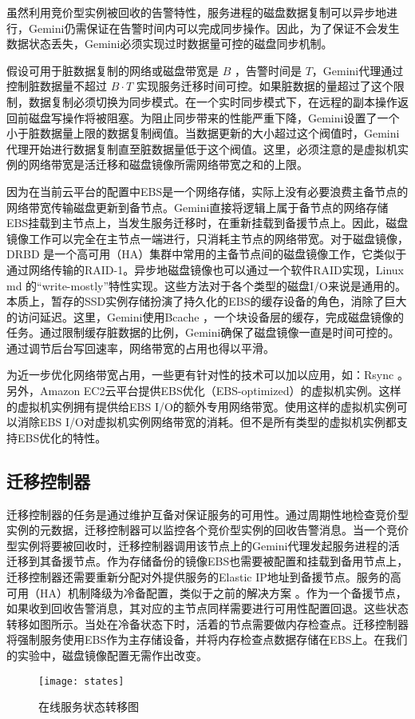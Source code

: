 虽然利用竞价型实例被回收的告警特性，服务进程的磁盘数据复制可以异步地进行，Gemini仍需保证在告警时间内可以完成同步操作。因此，为了保证不会发生数据状态丢失，Gemini必须实现过时数据量可控的磁盘同步机制。

假设可用于脏数据复制的网络或磁盘带宽是 $B$ ，告警时间是 $T$，Gemini代理通过控制脏数据量不超过 $B \cdot T$ 实现服务迁移时间可控。如果脏数据的量超过了这个限制，数据复制必须切换为同步模式。在一个实时同步模式下，在远程的副本操作返回前磁盘写操作将被阻塞。为阻止同步带来的性能严重下降，Gemini设置了一个小于脏数据量上限的数据复制阀值。当数据更新的大小超过这个阀值时，Gemini代理开始进行数据复制直至脏数据量低于这个阀值。这里，必须注意的是虚拟机实例的网络带宽是活迁移和磁盘镜像所需网络带宽之和的上限。

因为在当前云平台的配置中EBS是一个网络存储，实际上没有必要浪费主备节点的网络带宽传输磁盘更新到备节点。Gemini直接将逻辑上属于备节点的网络存储EBS挂载到主节点上，当发生服务迁移时，在重新挂载到备援节点上。因此，磁盘镜像工作可以完全在主节点一端进行，只消耗主节点的网络带宽。对于磁盘镜像，DRBD \cite{DRBD:2015} 是一个高可用（HA）集群中常用的主备节点间的磁盘镜像工作，它类似于通过网络传输的RAID-1。异步地磁盘镜像也可以通过一个软件RAID实现，Linux md \cite{Linux_md:2016} 的``write-mostly''特性实现。这些方法对于各个类型的磁盘I/O来说是通用的。本质上，暂存的SSD实例存储扮演了持久化的EBS的缓存设备的角色，消除了巨大的访问延迟。这里，Gemini使用Bcache \cite{Bcache:2016}，一个块设备层的缓存，完成磁盘镜像的任务。通过限制缓存脏数据的比例，Gemini确保了磁盘镜像一直是时间可控的。通过调节后台写回速率，网络带宽的占用也得以平滑。

为近一步优化网络带宽占用，一些更有针对性的技术可以加以应用，如：Rsync \cite{Rsync:2016}。另外，Amazon EC2云平台提供EBS优化（EBS-optimized）的虚拟机实例。这样的虚拟机实例拥有提供给EBS I/O的额外专用网络带宽。使用这样的虚拟机实例可以消除EBS I/O对虚拟机实例网络带宽的消耗。但不是所有类型的虚拟机实例都支持EBS优化的特性。

\subsection{迁移控制器}
迁移控制器的任务是通过维护互备对保证服务的可用性。通过周期性地检查竞价型实例的元数据，迁移控制器可以监控各个竞价型实例的回收告警消息。当一个竞价型实例将要被回收时，迁移控制器调用该节点上的Gemini代理发起服务进程的活迁移到其备援节点。作为存储备份的镜像EBS也需要被配置和挂载到备用节点上，迁移控制器还需要重新分配对外提供服务的Elastic IP地址到备援节点。服务的高可用（HA）机制降级为冷备配置，类似于之前的解决方案 \cite{He:2015:CCH:2749246.2749275}。作为一个备援节点，如果收到回收告警消息，其对应的主节点同样需要进行可用性配置回退。这些状态转移如图所示。当处在冷备状态下时，活着的节点需要做内存检查点。迁移控制器将强制服务使用EBS作为主存储设备，并将内存检查点数据存储在EBS上。在我们的实验中，磁盘镜像配置无需作出改变。
\begin{figure}[]
  \centering
  \texttt{[image: states]}
  \caption{在线服务状态转移图}
  \label{figure:states}
\end{figure}

